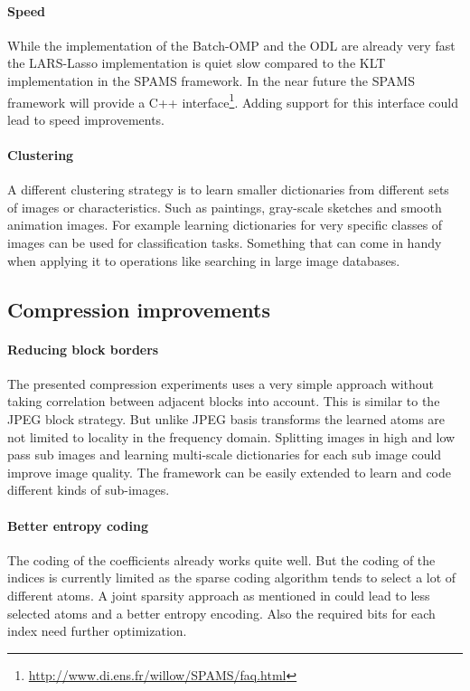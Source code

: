 \paragraph{Speed}
While the implementation of the Batch-OMP and the ODL are already very fast
the LARS-Lasso implementation is quiet slow compared to the KLT implementation
in the SPAMS framework. In the near future the SPAMS framework will provide a
C++ interface\footnote{\url{http://www.di.ens.fr/willow/SPAMS/faq.html}}. Adding
support for this interface could lead to speed improvements. 

\paragraph{Clustering}
A different clustering strategy is to learn smaller dictionaries from different
sets of images or characteristics. Such as paintings, gray-scale sketches and
smooth animation images. For example learning dictionaries for very specific
classes of images can be used for classification tasks. Something that can come
in handy when applying it to operations like searching in large image databases.


\subsection{Compression improvements}
\paragraph{Reducing block borders} The presented compression experiments
uses a very simple approach without taking correlation between adjacent
blocks into account. This is similar to the JPEG block strategy. But unlike
JPEG basis transforms the learned atoms are not limited to locality in
the frequency domain. Splitting images in high and low pass sub images and
learning multi-scale dictionaries for each sub image could improve image
quality. The framework can be easily extended to learn and code different kinds
of sub-images.

\paragraph{Better entropy coding}
The coding of the coefficients already works quite well. But the coding of the
indices is currently limited as the sparse coding algorithm tends to select a
lot of different atoms. A joint sparsity approach as mentioned in
 could lead to less selected atoms and a better
entropy encoding. Also the required bits for each index need further
optimization.









